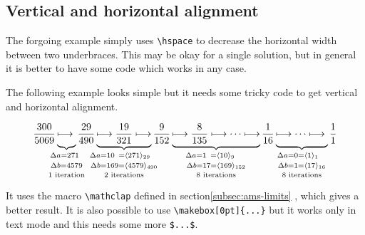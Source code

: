 \begin{table}[htb]
\subsection[Alignment]{Vertical and horizontal alignment}
The forgoing example simply uses \verb+\hspace+ to decrease the horizontal width between two
 underbraces. This may be okay for a single solution, but in general it is better to have some    %
code which works in any case.

The following example looks simple but it needs some tricky code to get vertical and horizontal
alignment.

\def\num#1{\hphantom{#1}}
\def\vsp{\vphantom{\rangle_1}}

\begin{equation*}
    \frac{300}{5069}%
    \underbrace{\longmapsto\vphantom{\frac{1}{1}}}_{%
	   \mathclap{\substack{%
	     \Delta a=271\num9\vsp \\[2pt]
	     \Delta b=4579\vsp\\[2pt]
	     \text{$1$ iteration}%
	   }}} \frac{29}{490}%
	\underbrace{\longmapsto \frac{19}{321}\longmapsto}_{%
      \mathclap{\substack{%
	     \Delta a=10\num{9}=\langle271\rangle_{29}\num{20}\\[2pt]
         \Delta b=169=\langle4579\rangle_{490}\\[2pt]
         \text{$2$ iterations}
      }}} \frac{9}{152}
    \underbrace{\longmapsto \frac{8}{135}\longmapsto\dots\longmapsto}_{%
      \substack{%
	    \Delta a=1\num{7}=\langle10\rangle_{9}\num{119}\\[2pt]
	    \Delta b=17=\langle169\rangle_{152}\\[2pt]
	    \text{$8$ iterations}
      }} \frac{1}{16}
    \underbrace{\longmapsto\dots\longmapsto\vphantom{\frac{8}{135}}}_{%
      \substack{%
	     \Delta a=0=\langle1\rangle_{1}\num{76} \\[2pt]
	     \Delta b=1=\langle17\rangle_{16} \\[2pt]
         \text{$8$ iterations}
      }} \frac{1}{1}
\end{equation*}

It uses the macro \verb+\mathclap+ defined in section\vref{subsec:ams-limits}
, which gives a better result.    %
It is also possible to use \verb+\makebox[0pt]{...}+ but it works only in text mode
and this needs some more \verb+$...$+.


\end{table}
